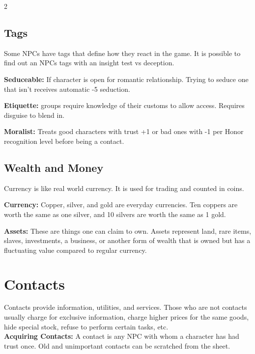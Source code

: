 \begin{multicols}{2}
\subsection{Tags}

Some NPCs have tags that define how they react in the game. It is possible to find out an NPCs tags with an insight test vs deception. 

\begin{proplist}
    \item \textbf{Seduceable:} If character is open for romantic relationship. Trying to seduce one that isn't receives automatic -5 seduction.
    \item \textbf{Etiquette:} groups require knowledge of their customs to allow access. Requires disguise to blend in.
    \item \textbf{Moralist:} Treats good characters with trust +1 or bad ones with -1 per Honor recognition level before being a contact.
\end{proplist}

\subsection{Wealth and Money}

Currency is like real world currency. It is used for trading and counted in coins.

\textbf{Currency:} Copper, silver, and gold are everyday currencies. Ten coppers are worth the same as one silver, and 10 silvers are worth the same as 1 gold.

\textbf{Assets:} These are things one can claim to own. Assets represent land, rare items, slaves, investments, a business, or another form of wealth that is owned but has a fluctuating value compared to regular currency.


\section{Contacts}

Contacts provide information, utilities, and services. Those who are not contacts usually charge for exclusive information, charge higher prices for the same goods, hide special stock, refuse to perform certain tasks, etc.\\

\textbf{Acquiring Contacts:} A contact is any NPC with whom a character has had trust once. Old and unimportant contacts can be scratched from the sheet.


\end{multicols}
